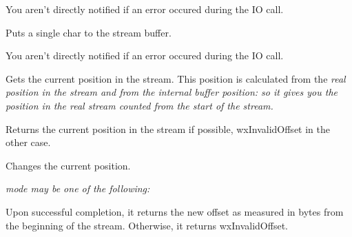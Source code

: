 
You aren't directly notified if an error occured during the IO call.





Puts a single char to the stream buffer.


You aren't directly notified if an error occured during the IO call.





Gets the current position in the stream. This position is calculated from
the \it{real} position in the stream and from the internal buffer position: so
it gives you the position in the \it{real} stream counted from the start of
the stream.


Returns the current position in the stream if possible, wxInvalidOffset in the
other case.

\label{wxstreambufferseek}


Changes the current position.

\it{mode} may be one of the following:

\twocolwidtha{5cm}
\begin{twocollist}\itemsep=0pt
\end{twocollist}


Upon successful completion, it returns the new offset as measured in bytes from
the beginning of the stream. Otherwise, it returns wxInvalidOffset.

